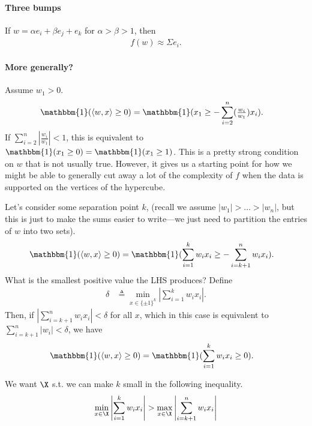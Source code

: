 \documentclass{article}
\begin{document}
\paragraph*{Three bumps}
If $w = \alpha e_i + \beta e_j + e_k$ for $\alpha > \beta > 1$, then
\begin{align}
  f(w) \approx \Sigma e_i.
\end{align}

\paragraph*{More generally?}
Assume $w_1 > 0$.
\begin{align*}
  \mathbbm{1}(\langle w, x \rangle \geq 0)
  &= \mathbbm{1}( x_1 \geq - \sum_{i=2}^{n} ( \tfrac{w_i}{w_1} ) x_i ).
\end{align*}
If $\sum_{i=2}^{n} | \tfrac{w_i}{w_1} | < 1$, this is equivalent to $\mathbbm{1}(x_1 \geq 0) = \mathbbm{1}(x_1 \geq 1)$.
This is a pretty strong condition on $w$ that is not usually true.
However, it gives us a starting point for how we might be able to generally cut away a lot of the complexity of $f$ when the data is supported on the vertices of the hypercube.

Let's consider some separation point $k$, (recall we assume $|w_1| > \ldots > |w_n|$, but this is just to make the sums easier to write—we just need to partition the entries of $w$ into two sets).
\begin{align*}
  \mathbbm{1}(\langle w, x \rangle \geq 0)
  &= \mathbbm{1}( \sum_{i=1}^{k} w_i x_i \geq - \sum_{i=k+1}^{n} w_i x_i ).
\end{align*}
What is the smallest positive value the LHS produces?
Define
\begin{align}
  \delta &\triangleq \min_{x \in \{ \pm 1 \}^k} \left| \sum_{i=1}^{k} w_i x_i \right|. \label{eq:delta}
\end{align}
Then, if $\left| \sum_{i=k+1}^{n} w_i x_i \right| < \delta$ for all $x$, which in this case is equivalent to $\sum_{i=k+1}^{n} \left| w_i \right| < \delta$, we have
\begin{align*}
  \mathbbm{1}(\langle w, x \rangle \geq 0)
  &= \mathbbm{1}( \sum_{i=1}^{k} w_i x_i \geq 0 ).
\end{align*}

We want $\X$ s.t. we can make $k$ small in the following inequality.
\begin{align*}
  \min_{x \in \X} \left| \sum_{i=1}^{k} w_i x_i \right| > \max_{x \in \X} \left| \sum_{i=k+1}^{n} w_i x_i \right| 
\end{align*}
\end{document}
